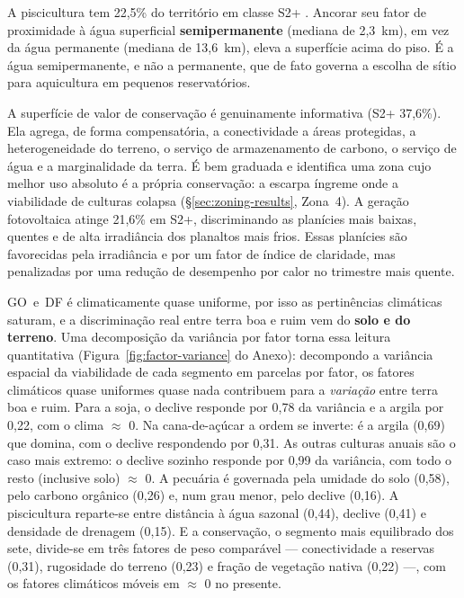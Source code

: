 A piscicultura tem 22,5\% do território em classe S2+ . Ancorar seu fator de proximidade
à água superficial \textbf{semipermanente} (mediana de 2,3~km), em vez da água permanente (mediana de
13,6~km), eleva a superfície acima do piso. É a água semipermanente, e não a permanente, que de
fato governa a escolha de sítio para aquicultura em pequenos reservatórios.

A superfície de valor de conservação é genuinamente informativa (S2+ 37,6\%).
Ela agrega, de forma compensatória, a conectividade a áreas protegidas, a
heterogeneidade do terreno, o serviço de armazenamento de carbono, o serviço de água e a
marginalidade da terra. É bem graduada e identifica
uma zona cujo melhor uso absoluto é a própria conservação: a escarpa íngreme onde a
viabilidade de culturas colapsa (\S\ref{sec:zoning-results}, Zona~4). A geração fotovoltaica
atinge 21,6\% em S2+, discriminando as planícies mais baixas, quentes e de alta irradiância dos
planaltos mais frios. Essas planícies são favorecidas pela irradiância e por um fator de índice
de claridade, mas penalizadas por uma redução de desempenho por calor no trimestre mais quente.


GO~e~DF é climaticamente quase uniforme, por isso as pertinências climáticas saturam, e a
discriminação real entre terra boa e ruim vem do \textbf{solo e do terreno}.
Uma decomposição da variância por fator torna essa leitura quantitativa
(Figura~\ref{fig:factor-variance} do Anexo): decompondo a
variância espacial da viabilidade de cada segmento em parcelas por fator, os fatores climáticos
quase uniformes quase nada contribuem para a \emph{variação} entre terra boa e ruim. Para a
soja, o declive responde por 0,78 da variância e a argila por 0,22, com o clima $\approx$ 0. Na
cana-de-açúcar a ordem se inverte: é a argila (0,69) que domina, com o declive respondendo por
0,31. As outras culturas anuais são o
caso mais extremo: o declive sozinho responde por 0,99 da variância, com todo o resto
(inclusive solo) $\approx$ 0. A pecuária é governada pela umidade do solo (0,58), pelo carbono
orgânico (0,26) e, num grau menor, pelo declive (0,16). A piscicultura reparte-se entre distância
à água sazonal (0,44), declive (0,41) e densidade de drenagem (0,15). E a conservação, o segmento
mais equilibrado dos sete, divide-se em três fatores de peso comparável --- conectividade a
reservas (0,31), rugosidade do terreno (0,23) e fração de vegetação nativa (0,22) ---, com os
fatores climáticos móveis em $\approx$ 0 no presente.

